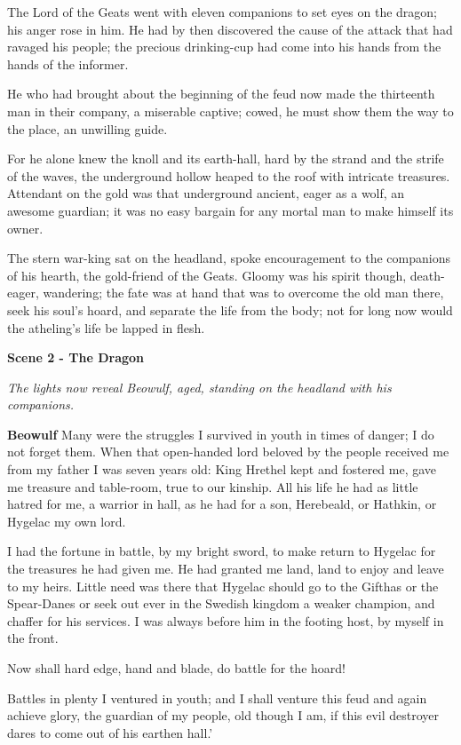 \documentclass[a4paper]{article}
\begin{document}
{The Lord of the Geats went with eleven companions
to set eyes on the dragon; his anger rose in him.
He had by then discovered the cause of the attack
that had ravaged his people; the precious drinking-cup
had come into his hands from the hands of the informer.

He who had brought about the beginning of the feud
now made the thirteenth man in their company,
a miserable captive; cowed, he must show them
the way to the place, an unwilling guide.

For he alone knew the knoll and its earth-hall,
hard by the strand and the strife of the waves,
the underground hollow heaped to the roof
with intricate treasures. Attendant on the gold
was that underground ancient, eager as a wolf,
an awesome guardian; it was no easy bargain
for any mortal man to make himself its owner.

The stern war-king sat on the headland,
spoke encouragement to the companions of his hearth,
the gold-friend of the Geats. Gloomy was his spirit though,
death-eager, wandering; the fate was at hand
that was to overcome the old man there,
seek his soul’s hoard, and separate
the life from the body; not for long now
would the atheling’s life be lapped in flesh.

\centerline{\textbf{Scene 2 - The Dragon}}

\centerline{\textit{The lights now reveal Beowulf, aged, standing on the headland with his companions.}}

\textbf{Beowulf} Many were the struggles I survived in youth
in times of danger; I do not forget them.
When that open-handed lord beloved by the people
received me from my father I was seven years old:
King Hrethel kept and fostered me,
gave me treasure and table-room, true to our kinship.
All his life he had as little hatred for me,
a warrior in hall, as he had for a son,
Herebeald, or Hathkin, or Hygelac my own lord.

I had the fortune in battle, by my bright sword,
to make return to Hygelac for the treasures he had given me.
He had granted me land, land to enjoy
and leave to my heirs. Little need was there
that Hygelac should go to the Gifthas or the Spear-Danes
or seek out ever in the Swedish kingdom
a weaker champion, and chaffer for his services.
I was always before him in the footing host,
by myself in the front.

Now shall hard edge,
hand and blade, do battle for the hoard!

Battles in plenty
I ventured in youth; and I shall venture this feud
and again achieve glory, the guardian of my people,
old though I am, if this evil destroyer
dares to come out of his earthen hall.’

}
\end{document}
